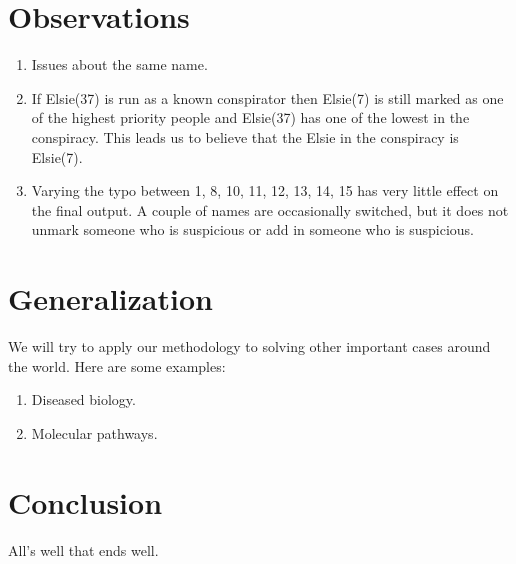 \documentclass{icmmcm}
\begin{document}
\section{Observations}
\begin{enumerate}
\item Issues about the same name.

\item If Elsie(37) is run as a known conspirator then Elsie(7) is still marked as one of the highest priority people and Elsie(37) has one of the lowest in the conspiracy.  This leads us to believe that the Elsie in the conspiracy is Elsie(7).
	
\item Varying the typo between 1, 8, 10, 11, 12, 13, 14, 15 has very little effect on the final output.  A couple of names are occasionally switched, but it does not unmark someone who is suspicious or add in someone who is suspicious.
\end{enumerate}

\section{Generalization}
We will try to apply our methodology
to solving other important cases around the world.
Here are some examples:
\begin{enumerate}
\item Diseased biology.
\item Molecular pathways.
\end{enumerate}

\section{Conclusion}

All's well that ends well.






\end{document}

